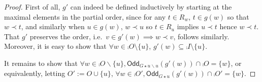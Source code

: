 \documentclass[a4paper,onecolumn,superscriptaddress,11pt,accepted=2020-04-27]{quantumarticle}
\newcommand{\symd}{\mathbin{\Delta}\xspace}
\newcommand{\Symdi}[1]{\underset{\scriptstyle #1}{\scalebox{1.5}{$\symd$}}\,}
\newcommand{\odd}[2]{\textsf{Odd}_{#1}\left(#2\right)}
\theoremstyle{definition}
\begin{document}
\begin{proof}%

 
First of all, $g'$ can indeed be defined inductively by starting at the maximal elements in the partial order, since for any $t\in R_w$, $t\in g(w)$ so that $w\prec t$, and similarly when $u\in g(w)$, $w\prec u$ so $t\in R_u$ implies $u\prec t$ hence $w\prec t$. That $g'$ preserves the order, i.e.\ $v\in g'(w)\implies w\prec v$, follows similarly. Moreover, it is easy to show that $\forall w\in \comp O\setminus \{u\}$, $g'(w)\subseteq \comp I\setminus \{u\}$. 

It remains to show that $\forall w\in \comp O\backslash \{u\}, \odd {G\star u \backslash u} {g'(w)} \cap \comp O = \{w\}$, or equivalently, letting $O':=O\cup \{u\}$, $\forall w\in \comp{O'}, \odd {G\star u} {g'(w)} \cap \comp{O'} = \{w\}$. 



\end{proof}
\end{document}
